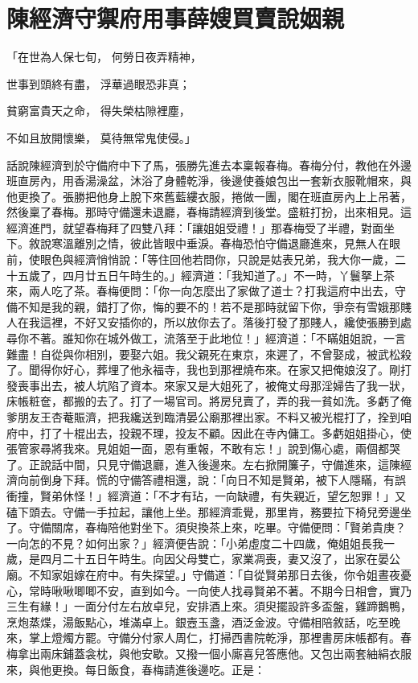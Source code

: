 %

\chapter{陳經濟守禦府用事\KG 薛嫂買賣說姻親}


\begin{showcontents}{}




「在世為人保七旬，  何勞日夜弄精神，

世事到頭終有盡，  浮華過眼恐非真；

貧窮富貴天之命，  得失榮枯隙裡塵，

不如且放開懷樂，  莫待無常鬼使侵。」

話說陳經濟到於守備府中下了馬，張勝先進去本稟報春梅。春梅分付，教他在外邊班直房內，用香湯澡盆，沐浴了身體乾淨，後邊使養娘包出一套新衣服靴帽來，與他更換了。張勝把他身上脫下來舊藍縷衣服，捲做一團，閣在班直房內上上吊著，然後稟了春梅。那時守備還未退廳，春梅請經濟到後堂。盛粧打扮，出來相見。這經濟進門，就望春梅拜了四雙八拜：「讓姐姐受禮！」那春梅受了半禮，對面坐下。敘說寒溫離別之情，彼此皆眼中垂淚。春梅恐怕守備退廳進來，見無人在眼前，使眼色與經濟悄悄說：「等住回他若問你，只說是姑表兄弟，我大你一歲，二十五歲了，四月廿五日午時生的。」經濟道：「我知道了。」不一時，丫鬟拏上茶來，兩人吃了茶。春梅便問：「你一向怎麼出了家做了道士？打我這府中出去，守備不知是我的親，錯打了你，悔的要不的！若不是那時就留下你，爭奈有雪娥那賤人在我這裡，不好又安插你的，所以放你去了。落後打發了那賤人，纔使張勝到處尋你不著。誰知你在城外做工，流落至于此地位！」經濟道：「不瞞姐姐說，一言難盡！自從與你相別，要娶六姐。我父親死在東京，來遲了，不曾娶成，被武松殺了。聞得你好心，葬埋了他永福寺，我也到那裡燒布來。在家又把俺娘沒了。剛打發喪事出去，被人坑陷了資本。來家又是大姐死了，被俺丈母那淫婦告了我一狀，床帳粧奩，都搬的去了。打了一場官司。將房兒賣了，弄的我一貧如洗。多虧了俺爹朋友王杏菴賑濟，把我纔送到臨清晏公廟那裡出家。不料又被光棍打了，拴到咱府中，打了十棍出去，投親不理，投友不顧。因此在寺內傭工。多虧姐姐掛心，使張管家尋將我來。見姐姐一面，恩有重報，不敢有忘！」說到傷心處，兩個都哭了。正說話中間，只見守備退廳，進入後邊來。左右掀開簾子，守備進來，這陳經濟向前倒身下拜。慌的守備答禮相還，說：「向日不知是賢弟，被下人隱瞞，有誤衝撞，賢弟休怪！」經濟道：「不才有玷，一向缺禮，有失親近，望乞恕罪！」又磕下頭去。守備一手拉起，讓他上坐。那經濟乖覺，那里肯，務要拉下椅兒旁邊坐了。守備關席，春梅陪他對坐下。須臾換茶上來，吃畢。守備便問：「賢弟貴庚？一向怎的不見？如何出家？」經濟便告說：「小弟虛度二十四歲，俺姐姐長我一歲，是四月二十五日午時生。向因父母雙亡，家業凋喪，妻又沒了，出家在晏公廟。不知家姐嫁在府中。有失探望。」守備道：「自從賢弟那日去後，你令姐晝夜憂心，常時啾啾唧唧不安，直到如今。一向使人找尋賢弟不著。不期今日相會，實乃三生有緣！」一面分付左右放卓兒，安排酒上來。須臾擺設許多盃盤，雞蹄鵝鴨，烹炮蒸煠，湯飯點心，堆滿卓上。銀壼玉盞，酒泛金波。守備相陪敘話，吃至晚來，掌上燈燭方罷。守備分付家人周仁，打掃西書院乾淨，那裡書房床帳都有。春梅拿出兩床鋪蓋衾枕，與他安歇。又撥一個小廝喜兒答應他。又包出兩套紬絹衣服來，與他更換。每日飯食，春梅請進後邊吃。正是：


\end{showcontents}
